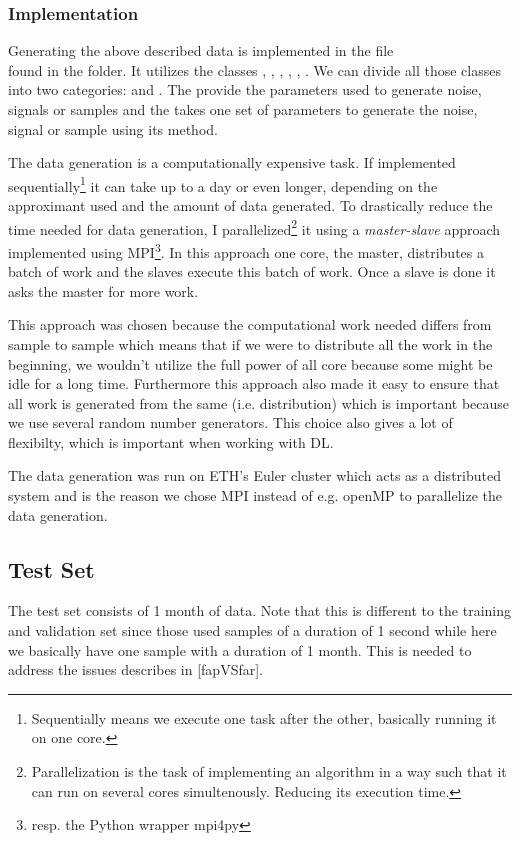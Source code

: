 \subsubsection{Implementation}
Generating the above described data is implemented in the file \\
 found in the  folder. It utilizes
the classes , , ,
, , . We can divide
all those classes into two categories:  and . The
 provide the parameters used to generate noise, signals or samples
and the  takes one set of parameters to generate the noise,
signal or sample using its  method.

The data generation is a computationally expensive task. If implemented
sequentially\footnote{Sequentially means we execute one task after the other,
basically running it on one core.} it can take
up to a day or even longer, depending on the approximant used and the
amount of data generated. To drastically reduce the time needed for data
generation, I parallelized\footnote{Parallelization is the task of implementing
an algorithm in a way such that it can run on several cores simultenously.
Reducing its execution time.} it using a \textit{master-slave} approach
implemented using MPI\footnote{resp. the Python wrapper mpi4py}. In
this approach one core, the master, distributes a batch of work and the slaves
execute this batch of work. Once a slave is done it asks the master for more
work.

This approach was chosen because the computational work needed differs from
sample to sample which means that if we were to distribute all the work in the
beginning, we wouldn't utilize the full power of all core because some might be
idle for a long time. Furthermore this approach also made it easy to ensure that
all work is generated from the same  (i.e. distribution) which is
important because we use several random number generators. This choice
also gives a lot of flexibilty, which is important when working with DL.

The data generation was run on ETH's Euler cluster which acts as a distributed
system and is the reason we chose MPI instead of e.g. openMP to parallelize the
data generation.

\subsection{Test Set}
The test set consists of 1 month of data. Note that this is different to the
training and validation set since those used samples of a duration of 1 second
while here we basically have one sample with a duration of 1 month. This is
needed to address the issues describes in [fapVSfar].

